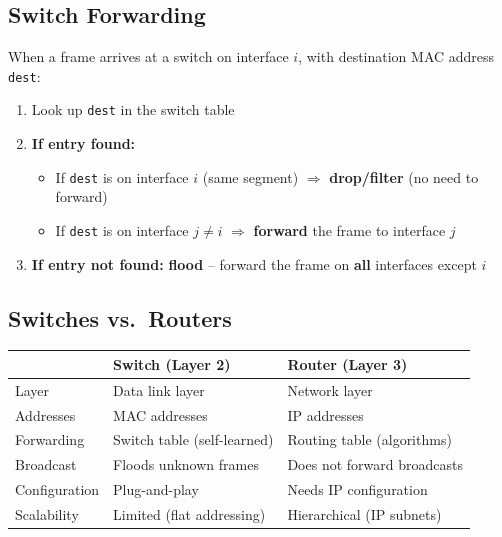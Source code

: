 \subsection{Switch Forwarding}

\begin{keybox}
When a frame arrives at a switch on interface $i$, with destination MAC address \texttt{dest}:

\begin{enumerate}[noitemsep]
    \item Look up \texttt{dest} in the switch table
    \item \textbf{If entry found:}
    \begin{itemize}[noitemsep]
        \item If \texttt{dest} is on interface $i$ (same segment) $\Rightarrow$ \textbf{drop/filter} (no need to forward)
        \item If \texttt{dest} is on interface $j \neq i$ $\Rightarrow$ \textbf{forward} the frame to interface $j$
    \end{itemize}
    \item \textbf{If entry not found:} \textbf{flood} -- forward the frame on \textbf{all} interfaces except $i$
\end{enumerate}
\end{keybox}

\subsection{Switches vs.\ Routers}

\begin{keybox}
\begin{center}
\begin{tabular}{lll}
\toprule
& \textbf{Switch (Layer 2)} & \textbf{Router (Layer 3)} \\
\midrule
Layer & Data link layer & Network layer \\
Addresses & MAC addresses & IP addresses \\
Forwarding & Switch table (self-learned) & Routing table (algorithms) \\
Broadcast & Floods unknown frames & Does not forward broadcasts \\
Configuration & Plug-and-play & Needs IP configuration \\
Scalability & Limited (flat addressing) & Hierarchical (IP subnets) \\
\bottomrule
\end{tabular}
\end{center}
\end{keybox}

